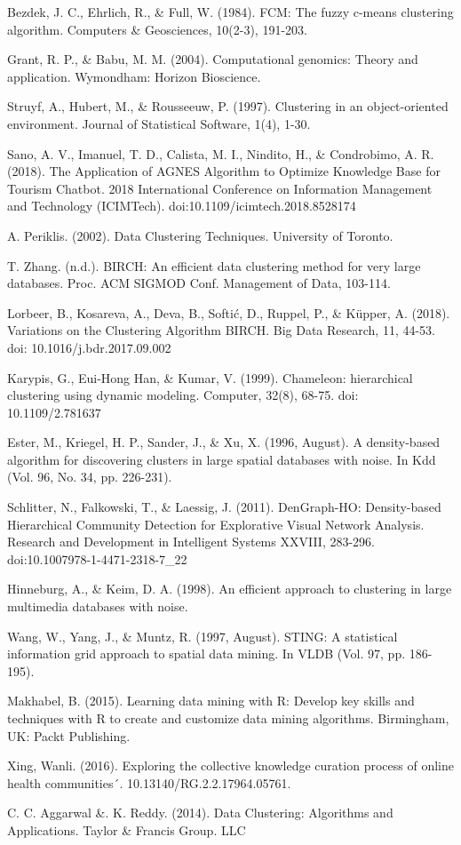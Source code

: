 \documentclass[10pt, a4paper]{article}
\begin{document}
\begin{thebibliography}{X}
 Bezdek, J. C., Ehrlich, R., \& Full, W. (1984). FCM: The fuzzy c-means clustering algorithm. Computers \& Geosciences, 10(2-3), 191-203.

 Grant, R. P., \& Babu, M. M. (2004). Computational genomics: Theory and application. Wymondham: Horizon Bioscience.

 Struyf, A., Hubert, M., \& Rousseeuw, P. (1997). Clustering in an object-oriented environment. Journal of Statistical Software, 1(4), 1-30.

 Sano, A. V., Imanuel, T. D., Calista, M. I., Nindito, H., \& Condrobimo, A. R. (2018). The Application of AGNES Algorithm to Optimize Knowledge Base for Tourism Chatbot. 2018 International Conference on Information Management and Technology (ICIMTech). doi:10.1109/icimtech.2018.8528174

 A. Periklis. (2002). Data Clustering Techniques. University of Toronto.

 T. Zhang. (n.d.). BIRCH: An efficient data clustering method for very large databases. Proc. ACM SIGMOD Conf. Management of Data, 103-114.

 Lorbeer, B., Kosareva, A., Deva, B., Softić, D., Ruppel, P., \& Küpper, A. (2018). Variations on the Clustering Algorithm BIRCH. Big Data Research, 11, 44-53. doi: 10.1016/j.bdr.2017.09.002

 Karypis, G., Eui-Hong Han, \& Kumar, V. (1999). Chameleon: hierarchical clustering using dynamic modeling. Computer, 32(8), 68-75. doi: 10.1109/2.781637

 Ester, M., Kriegel, H. P., Sander, J., \& Xu, X. (1996, August). A density-based algorithm for discovering clusters in large spatial databases with noise. In Kdd (Vol. 96, No. 34, pp. 226-231).

 Schlitter, N., Falkowski, T., \& Laessig, J. (2011). DenGraph-HO: Density-based Hierarchical Community Detection for Explorative Visual Network Analysis. Research and Development in Intelligent Systems XXVIII, 283-296. doi:10.1007\/978-1-4471-2318-7\_22

 Hinneburg, A., \& Keim, D. A. (1998). An efficient approach to clustering in large multimedia databases with noise.

 Wang, W., Yang, J., \& Muntz, R. (1997, August). STING: A statistical information grid approach to spatial data mining. In VLDB (Vol. 97, pp. 186-195).

 Makhabel, B. (2015). Learning data mining with R: Develop key skills and techniques with R to create and customize data mining algorithms. Birmingham, UK: Packt Publishing.

 Xing, Wanli. (2016). Exploring the collective knowledge curation process of online health communities´. 10.13140/RG.2.2.17964.05761. 

 C. C. Aggarwal \&. K. Reddy. (2014). Data Clustering: Algorithms and Applications. Taylor \& Francis Group. LLC

\end{thebibliography}    
    
\end{document}

